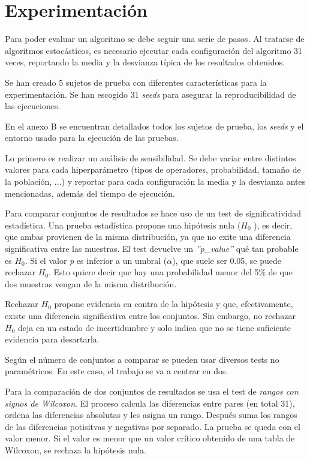\chapter{Experimentación}
\label{ch:experimentacion}

Para poder evaluar un algoritmo se debe seguir una serie de pasos. Al tratarse de algoritmos estocásticos, es necesario ejecutar cada configuración del algoritmo 31 veces, reportando la media y la desvianza típica de los resultados obtenidos.

Se han creado 5 sujetos de prueba con diferentes características para la experimentación. Se han escogido 31 \textit{seeds} para asegurar la reproducibilidad de las ejecuciones.

En el anexo B se encuentran detallados todos los sujetos de prueba, los \textit{seeds} y el entorno usado para la ejecución de las pruebas.

Lo primero es realizar un análisis de sensibilidad. Se debe variar entre distintos valores para cada hiperparámetro (tipos de operadores, probabilidad, tamaño de la población, ...) y reportar para cada configuración la media y la desvianza antes mencionadas, además del tiempo de ejecución.

Para comparar conjuntos de resultados se hace uso de un test de significatividad estadística. Una prueba estadística propone una hipótesis nula (\(H_0\) ), es decir, que ambas provienen de la misma distribución, ya que no exite una diferencia significativa entre las muestras. El test devuelve un \textit{''p\_value''} qué tan probable es \(H_0\). Si el valor \textit{p} es inferior a un umbral ($\alpha$), que suele ser 0.05, se puede rechazar \(H_0\). Esto quiere decir que hay una probabilidad menor del 5\% de que dos muestras vengan de la misma distribución.

Rechazar \(H_0\) propone evidencia en contra de la hipótesis y que, efectivamente, existe una diferencia significativa entre los conjuntos. Sin embargo, no rechazar \(H_0\) deja en un estado de incertidumbre y solo indica que no se tiene suficiente evidencia para desartarla.

Según el número de conjuntos a comparar se pueden usar diversos tests no paramétricos. En este caso, el trabajo se va a centrar en dos.

Para la comparación de dos conjuntos de resultados se usa el test de \textit{rangos con signos de Wilcoxon}. El proceso calcula las diferencias entre pares (en total 31), ordena las diferencias absolutas y les asigna un rango. Después suma los rangos de las diferencias potisitvas y negativas por separado. La prueba se queda con el valor menor. Si el valor es menor que un valor crítico obtenido de una tabla de Wilcoxon, se rechaza la hipótesis nula.~\cite{scipy2024wilcoxon}

